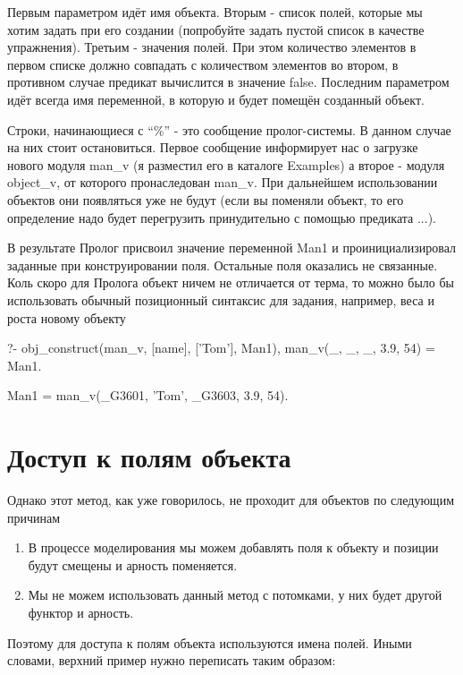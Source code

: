 \documentclass[a4paper]{book}
\begin{document}
Первым параметром идёт имя объекта. Вторым - список полей,
которые мы хотим задать при его создании (попробуйте задать
пустой список в качестве упражнения). Третьим - значения
полей. При этом количество элементов в первом списке должно
совпадать с количеством элементов во втором, в противном случае
предикат вычислится в значение false. Последним параметром идёт
всегда имя переменной, в которую и будет помещён созданный
объект. 

Строки, начинающиеся с ``\%'' - это сообщение пролог-системы. В
данном случае на них стоит остановиться. Первое сообщение
информирует нас о загрузке нового модуля man\_v (я разместил его
в каталоге Examples) а второе - модуля object\_v, от которого
пронаследован man\_v. При дальнейшем использовании объектов они
появляться уже не будут (если вы поменяли объект, то его
определение надо будет перегрузить принудительно с помощью
предиката ...).

В результате Пролог присвоил значение переменной Man1 и
проинициализировал заданные при конструировании поля. Остальные
поля оказались не связанные. Коль скоро для Пролога объект ничем
не отличается от терма, то можно было бы использовать обычный
позиционный синтаксис для задания, например, веса и роста новому
объекту

\begin{example}{}{}
?- obj_construct(man_v, [name], ['Tom'], Man1), 
   man_v(_, _, _, 3.9, 54) = Man1.

Man1 = man_v(_G3601, 'Tom', _G3603, 3.9, 54).
\end{example}

\section{Доступ к полям объекта}

Однако этот метод, как уже говорилось, не проходит для объектов
по следующим причинам

\begin{enumerate}
\item В процессе моделирования мы можем добавлять поля к объекту и
позиции будут смещены и арность поменяется.
\item Мы не можем использовать данный метод с потомками, у них будет
другой функтор и арность.
\end{enumerate}

Поэтому для доступа к полям объекта {\/} используются имена
полей. Иными словами, верхний пример нужно переписать таким
образом:
\end{document}
